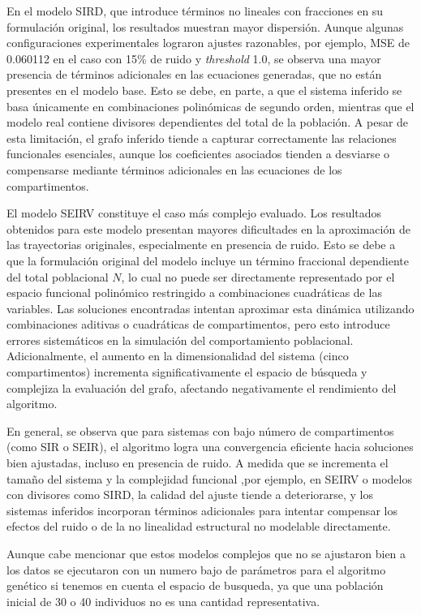 En el modelo SIRD, que introduce términos no lineales con fracciones en su formulación original, los resultados muestran mayor dispersión. Aunque algunas configuraciones experimentales lograron ajustes razonables, por ejemplo, MSE de 0.060112 en el caso con 15\% de ruido y \textit{threshold} 1.0, se observa una mayor presencia de términos adicionales en las ecuaciones generadas, que no están presentes en el modelo base. Esto se debe, en parte, a que el sistema inferido se basa únicamente en combinaciones polinómicas de segundo orden, mientras que el modelo real contiene divisores dependientes del total de la población. A pesar de esta limitación, el grafo inferido tiende a capturar correctamente las relaciones funcionales esenciales, aunque los coeficientes asociados tienden a desviarse o compensarse mediante términos adicionales en las ecuaciones de los compartimentos.

El modelo SEIRV constituye el caso más complejo evaluado. Los resultados obtenidos para este modelo presentan mayores dificultades en la aproximación de las trayectorias originales, especialmente en presencia de ruido. Esto se debe a que la formulación original del modelo incluye un término fraccional dependiente del total poblacional \( N \), lo cual no puede ser directamente representado por el espacio funcional polinómico restringido a combinaciones cuadráticas de las variables. Las soluciones encontradas intentan aproximar esta dinámica utilizando combinaciones aditivas o cuadráticas de compartimentos, pero esto introduce errores sistemáticos en la simulación del comportamiento poblacional. Adicionalmente, el aumento en la dimensionalidad del sistema (cinco compartimentos) incrementa significativamente el espacio de búsqueda y complejiza la evaluación del grafo, afectando negativamente el rendimiento del algoritmo.

En general, se observa que para sistemas con bajo número de compartimentos (como SIR o SEIR), el algoritmo logra una convergencia eficiente hacia soluciones bien ajustadas, incluso en presencia de ruido. A medida que se incrementa el tamaño del sistema y la complejidad funcional ,por ejemplo, en SEIRV o modelos con divisores como SIRD, la calidad del ajuste tiende a deteriorarse, y los sistemas inferidos incorporan términos adicionales para intentar compensar los efectos del ruido o de la no linealidad estructural no modelable directamente. 

Aunque cabe mencionar que estos modelos complejos que no se ajustaron bien a los datos se ejecutaron con un numero bajo de par\'ametros para el algoritmo gen\'etico si tenemos en cuenta el espacio de busqueda, ya que una poblaci\'on inicial de 30 o 40 individuos no es una cantidad representativa.

